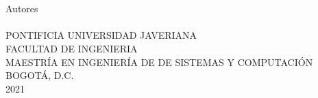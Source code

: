 \thispagestyle{empty}


\begin{center}
		\vspace*{2cm}
		\fontsize{16pt}{16pt}\textbf{\CODIGOTG\ }\\
		\fontsize{14pt}{14pt}\selectfont \TITULOTG\ \\ %
		\vspace*{5cm}
		\fontsize{14pt}{14pt}\selectfont Autores\\
		\AUTORESTG\ \\
		\vspace*{5cm}
		\fontsize{14pt}{14pt}\selectfont PONTIFICIA UNIVERSIDAD JAVERIANA\\
		FACULTAD DE INGENIERIA\\
		MAESTRÍA EN INGENIERÍA DE DE SISTEMAS Y COMPUTACIÓN\\
		BOGOTÁ, D.C.\\
		2021 
\end{center}

